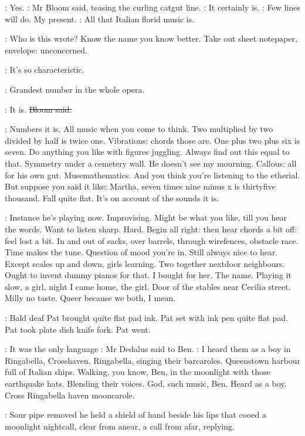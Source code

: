\Bloom:
Yes.
:
Mr Bloom said,
teasing the curling catgut line.
\Bloom:
It certainly is.
\BloomInt:
Few lines will do.
My present.
\Bloom:
All that Italian florid music is.

\BloomInt:
Who is this wrote?
Know the name you know better.
Take out sheet notepaper,
envelope:
unconcerned.

\Bloom:
It's so characteristic.

\goulding:
Grandest number in the whole opera.

\Bloom:
It is.
\sout{Bloom said.}

\BloomInt:
Numbers it is.
All music when you come to think.
Two multiplied by two
divided by half is twice one.
Vibrations:
chords those are.
One plus two
plus six is seven.
Do anything you like with figures juggling.
Always find
out this equal to that.
Symmetry under a cemetery wall.
He doesn't see my
mourning.
Callous:
all for his own gut.
Musemathematics.
And you think
you're listening to the etherial.
But suppose you said it like:
Martha,
seven times nine minus x is thirtyfive thousand.
Fall quite flat.
It's on
account of the sounds it is.

\BloomInt:
Instance he's playing now.
Improvising.
Might be what you like,
till
you hear the words.
Want to listen sharp.
Hard.
Begin all right:
then hear
chords a bit off:
feel lost a bit.
In and out of sacks,
over barrels,
through wirefences,
obstacle race.
Time makes the tune.
Question of mood
you're in.
Still always nice to hear.
Except scales up and down,
girls
learning.
Two together nextdoor neighbours.
Ought to invent dummy pianos
for that.
I bought for her.
The name.
Playing it slow,
a girl,
night I came home,
the girl.
Door of the stables near Cecilia street.
Milly no taste.
Queer because we both,
I mean.

:
Bald deaf Pat brought quite flat pad ink.
Pat set with ink pen quite
flat pad.
Pat took plate dish knife fork.
Pat went.

\simon:
It was the only language
:
Mr Dedalus said to Ben.
\simon:
I heard them as a
boy in Ringabella,
Crosshaven,
Ringabella,
singing their barcaroles.
Queenstown harbour full of Italian ships.
Walking,
you know,
Ben,
in the
moonlight with those earthquake hats.
Blending their voices.
God,
such
music,
Ben.
Heard as a boy.
Cross Ringabella haven mooncarole.

:
Sour pipe removed he held a shield of hand beside his lips that cooed
a moonlight nightcall,
clear from anear,
a call from afar,
replying.


